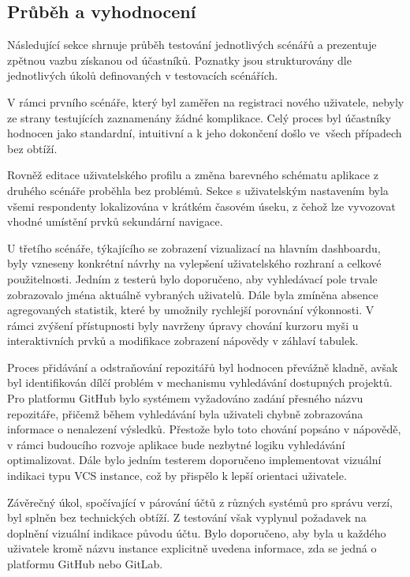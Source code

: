 \subsection{Průběh a vyhodnocení}
Následující sekce shrnuje průběh testování jednotlivých scénářů a prezentuje zpětnou vazbu získanou od účastníků. Poznatky jsou strukturovány dle jednotlivých úkolů definovaných v testovacích scénářích.

V rámci prvního scénáře, který byl zaměřen na registraci nového uživatele, nebyly ze strany testujících zaznamenány žádné komplikace. Celý proces byl účastníky hodnocen jako standardní, intuitivní a k jeho dokončení došlo ve~všech případech bez obtíží.

Rovněž editace uživatelského profilu a změna barevného schématu aplikace z druhého scénáře proběhla bez problémů. Sekce s uživatelským nastavením byla všemi respondenty lokalizována v krátkém časovém úseku, z čehož lze vyvozovat vhodné umístění prvků sekundární navigace.

U třetího scénáře, týkajícího se zobrazení vizualizací na hlavním dashboardu, byly vzneseny konkrétní návrhy na vylepšení uživatelského rozhraní a celkové použitelnosti. Jedním z testerů bylo doporučeno, aby vyhledávací pole trvale zobrazovalo jména aktuálně vybraných uživatelů. Dále byla zmíněna absence agregovaných statistik, které by umožnily rychlejší porovnání výkonnosti. V rámci zvýšení přístupnosti byly navrženy úpravy chování kurzoru myši u interaktivních prvků a modifikace zobrazení nápovědy v záhlaví tabulek.

Proces přidávání a odstraňování repozitářů byl hodnocen převážně kladně, avšak byl identifikován dílčí problém v mechanismu vyhledávání dostupných projektů. Pro platformu GitHub bylo systémem vyžadováno zadání přesného názvu repozitáře, přičemž během vyhledávání byla uživateli chybně zobrazována informace o nenalezení výsledků. Přestože bylo toto chování popsáno v nápovědě, v rámci budoucího rozvoje aplikace bude nezbytné logiku vyhledávání optimalizovat. Dále bylo jedním testerem doporučeno implementovat vizuální indikaci typu VCS instance, což by přispělo k lepší orientaci uživatele.

Závěrečný úkol, spočívající v párování účtů z různých systémů pro správu verzí, byl splněn bez technických obtíží. Z testování však vyplynul požadavek na doplnění vizuální indikace původu účtu. Bylo doporučeno, aby byla u každého uživatele kromě názvu instance explicitně uvedena informace, zda se jedná o platformu GitHub nebo GitLab.

